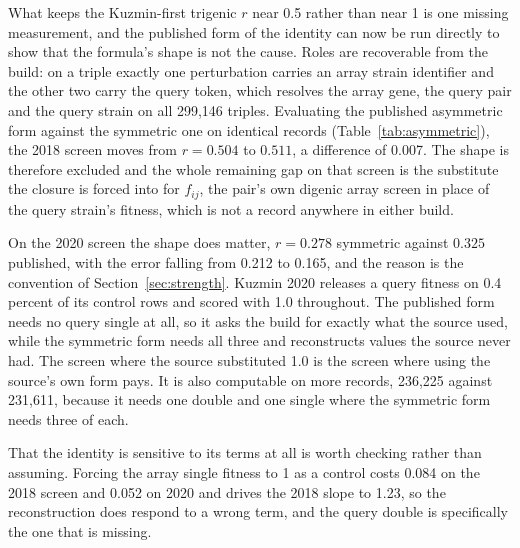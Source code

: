 What keeps the Kuzmin-first trigenic $r$ near 0.5 rather than near 1 is one missing
measurement, and the published form of the identity can now be run directly to show
that the formula's shape is not the cause. Roles are recoverable from the build: on a
triple exactly one perturbation carries an array strain identifier and the other two
carry the query token, which resolves the array gene, the query pair and the query
strain on all 299{,}146 triples. Evaluating the published asymmetric form against the
symmetric one on identical records (Table~\ref{tab:asymmetric}), the 2018 screen moves
from $r = 0.504$ to $0.511$, a difference of 0.007. The shape is therefore excluded and
the whole remaining gap on that screen is the substitute the closure is forced into for
$f_{ij}$, the pair's own digenic array screen in place of the query strain's fitness,
which is not a record anywhere in either build.

On the 2020 screen the shape does matter, $r = 0.278$ symmetric against $0.325$
published, with the error falling from 0.212 to 0.165, and the reason is the convention
of Section~\ref{sec:strength}. Kuzmin 2020 releases a query fitness on 0.4 percent of
its control rows and scored with 1.0 throughout. The published form needs no query
single at all, so it asks the build for exactly what the source used, while the
symmetric form needs all three and reconstructs values the source never had. The screen
where the source substituted 1.0 is the screen where using the source's own form pays.
It is also computable on more records, 236{,}225 against 231{,}611, because it needs one
double and one single where the symmetric form needs three of each.

That the identity is sensitive to its terms at all is worth checking rather than
assuming. Forcing the array single fitness to 1 as a control costs 0.084 on the 2018
screen and 0.052 on 2020 and drives the 2018 slope to 1.23, so the reconstruction does
respond to a wrong term, and the query double is specifically the one that is missing.

\begin{table}[htbp]
\centering
\footnotesize
\caption{The published asymmetric identity against the symmetric form on the 029 build,
same records and the same Kuzmin-first policy with the triple's own year promoted. The
third row of each screen forces the array single fitness to 1 as a sensitivity control.
Generated by \texttt{closure\_recompute\_asymmetric.py}.}
\label{tab:asymmetric}

\end{table}

